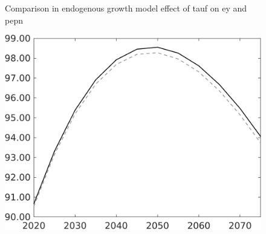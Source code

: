 \documentclass[12pt]{article}
\begin{document}
\begin{figure}{Comparison in endogenous growth model effect of tauf on ey and pepn }
\begin{minipage}[]{0.32\textwidth}
	\end{minipage}
	\begin{minipage}[]{0.32\textwidth}
		\includegraphics[width=1\textwidth]{../../codding_model/own_basedOnFried/optimalPol_010922_revision/figures/all_13Sept22/PerdifNoTauf_Equlab_regime0_CompTaul_pepn_spillover0_nsk0_xgr0_knspil1_sep0_LFlimit0_emsbase0_countec0_GovRev0_etaa0.79_lgd0.png}
	\end{minipage}
\end{figure}
\end{document}
